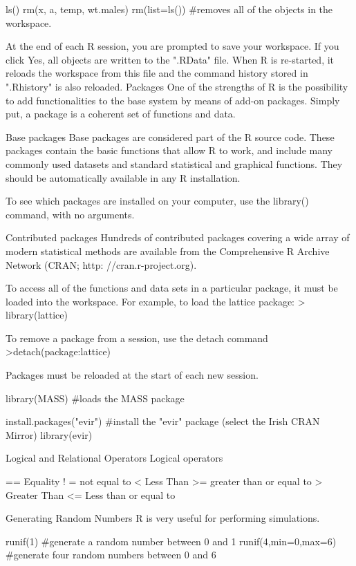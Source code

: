 ls()
rm(x, a, temp, wt.males)
rm(list=ls())								#removes all of the objects in the workspace.


At the end of each R session, you are prompted to save your workspace. If you click Yes, all objects are written to the ".RData" file. 
When R is re-started, it reloads the workspace from this file and the command history stored in ".Rhistory" is also reloaded.
Packages
One of the strengths of R is the possibility to add functionalities to the base system by means of add-on packages. Simply put, a package is a coherent set of functions and
data.
 


Base packages
Base packages are considered part of the R source code. These packages contain the basic functions that allow R to work, and include many commonly used datasets and standard statistical and graphical functions. They should be automatically available in any R installation.


To see which packages are installed on your computer, use the library() command, with no arguments.

Contributed packages
Hundreds of contributed packages covering a wide array of modern statistical methods are available from the Comprehensive R Archive Network (CRAN; http: //cran.r-project.org).

To access all of the functions and data sets in a particular package, it must be loaded into the workspace. 
For example, to load the lattice package:
> library(lattice)

To remove a package from a session, use the detach command
>detach(package:lattice)

Packages must be reloaded at the start of each new session.


library(MASS)							  #loads the MASS package

install.packages("evir")			#install the "evir" package (select the Irish CRAN Mirror)
library(evir)

Logical and Relational Operators
Logical operators

 ==
Equality
 ! = 
 not equal to
 < 
Less Than
 >=
 greater than or equal to
>
Greater Than
 <=
 Less than or equal to
 


Generating Random Numbers
R is very useful for performing simulations.


runif(1)										 #generate a random number between 0 and 1
runif(4,min=0,max=6) 			  #generate four random numbers between 0 and 6

